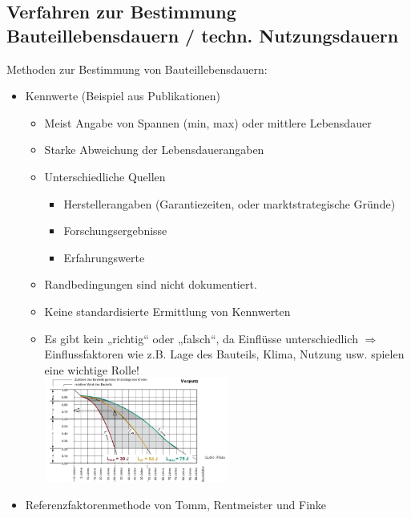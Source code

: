 \documentclass[fleqn,twoside,dvipsnames]{article}
\begin{document}
    \subsection{Verfahren zur Bestimmung Bauteillebensdauern / techn. Nutzungsdauern}
        Methoden zur Bestimmung von Bauteillebensdauern:
        \begin{itemize}
            \item Kennwerte (Beispiel aus Publikationen)
                \begin{itemize}
                    \item Meist Angabe von Spannen (min, max) oder mittlere Lebensdauer
                    \item Starke Abweichung der Lebensdauerangaben
                    \item Unterschiedliche Quellen
                        \begin{itemize}
                            \item Herstellerangaben (Garantiezeiten, oder marktstrategische Gründe)
                            \item Forschungsergebnisse
                            \item Erfahrungswerte
                        \end{itemize}
                    \item Randbedingungen sind nicht dokumentiert.
                    \item Keine standardisierte Ermittlung von Kennwerten
                    \item Es gibt kein „richtig“ oder „falsch“, da Einflüsse unterschiedlich
                    $\Rightarrow$ Einflussfaktoren wie z.B. Lage des Bauteils, Klima, Nutzung usw. spielen eine wichtige Rolle!\\
                    \includegraphics[width=0.5\textwidth]{Grafiken/Verfahren zur Bestimmung von Bauteillebensdauern/Einfluss Umweltbedingungen.png}
                \end{itemize}
            \item Referenzfaktorenmethode von Tomm, Rentmeister und Finke

\end{itemize}
\end{document}
